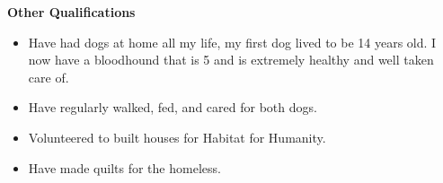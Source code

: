 \documentclass[11pt]{article}
\begin{document}
{\large \textbf{Other Qualifications}}

\begin{itemize}
	\item Have had dogs at home all my life, my first dog lived to be 14 years old.  I now have a bloodhound that is 5 and is extremely healthy and well taken care of.
	\item Have regularly walked, fed, and cared for both dogs.
	\item Volunteered to built houses for Habitat for Humanity.
	\item Have made quilts for the homeless.
\end{itemize}
\end{document}
